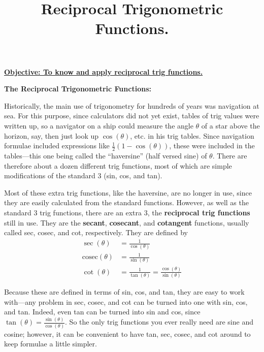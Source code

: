 \documentclass{article}
\def\cosec{\mathrm{cosec}}
\begin{document}
\title{Reciprocal Trigonometric Functions.}
\date{}

\maketitle
\thispagestyle{empty}

\Large

\textbf{\underline{Objective: To know and apply reciprocal trig functions.}}




\vspace{5mm}


\textbf{The Reciprocal Trigonometric Functions:}

\vspace{5mm}

Historically, the main use of trigonometry for hundreds of years was navigation at sea. For this purpose, since calculators did not yet exist, tables of trig values were written up, so a navigator on a ship could measure the angle $\theta$ of a star above the horizon, say, then just look up $\cos(\theta)$, etc. in his trig tables. Since navigation formulae included expressions like $\frac{1}{2}(1-\cos(\theta))$, these were included in the tables---this one being called the ``haversine'' (half versed sine) of $\theta$. There are therefore about a dozen different trig functions, most of which are simple modifications of the standard 3 (sin, cos, and tan).

Most of these extra trig functions, like the haversine, are no longer in use, since they are easily calculated from the standard functions. However, as well as the standard 3 trig functions, there are an extra 3, the \textbf{reciprocal trig functions} still in use. They are the \textbf{secant}, \textbf{cosecant}, and \textbf{cotangent} functions, usually called sec, cosec, and cot, respectively. They are defined by
\begin{align*}
\sec(\theta)&=\frac{1}{\cos(\theta)}\\
\cosec(\theta)&=\frac{1}{\sin(\theta)}\\
\cot(\theta)&=\frac{1}{\tan(\theta)}=\frac{\cos(\theta)}{\sin(\theta)}
\end{align*}

Because these are defined in terms of sin, cos, and tan, they are easy to work with---any problem in sec, cosec, and cot can be turned into one with sin, cos, and tan. Indeed, even tan can be turned into sin and cos, since $\tan(\theta)=\frac{\sin(\theta)}{\cos(\theta)}$. So the only trig functions you ever really need are sine and cosine; however, it can be convenient to have tan, sec, cosec, and cot around to keep formulae a little simpler.
\end{document}

